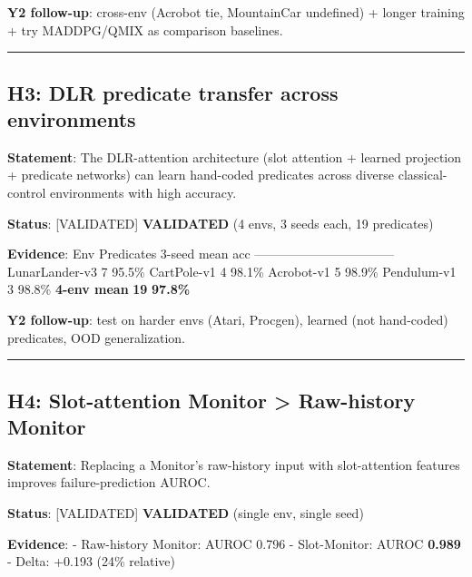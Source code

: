 \documentclass[
]{article}
\begin{document}
\textbf{Y2 follow-up}: cross-env (Acrobot tie, MountainCar undefined) +
longer training + try MADDPG/QMIX as comparison baselines.

\begin{center}\rule{0.5\linewidth}{0.5pt}\end{center}

\subsection{H3: DLR predicate transfer across
environments}\label{h3-dlr-predicate-transfer-across-environments}

\textbf{Statement}: The DLR-attention architecture (slot attention +
learned projection + predicate networks) can learn hand-coded predicates
across diverse classical-control environments with high accuracy.

\textbf{Status}: {[}VALIDATED{]} \textbf{VALIDATED} (4 envs, 3 seeds
each, 19 predicates)

\textbf{Evidence}: \textbar{} Env \textbar{} Predicates \textbar{}
3-seed mean acc \textbar{}
\textbar-----\textbar-----------\textbar------------------\textbar{}
\textbar{} LunarLander-v3 \textbar{} 7 \textbar{} 95.5\% \textbar{}
\textbar{} CartPole-v1 \textbar{} 4 \textbar{} 98.1\% \textbar{}
\textbar{} Acrobot-v1 \textbar{} 5 \textbar{} 98.9\% \textbar{}
\textbar{} Pendulum-v1 \textbar{} 3 \textbar{} 98.8\% \textbar{}
\textbar{} \textbf{4-env mean} \textbar{} \textbf{19} \textbar{}
\textbf{97.8\%} \textbar{}

\textbf{Y2 follow-up}: test on harder envs (Atari, Procgen), learned
(not hand-coded) predicates, OOD generalization.

\begin{center}\rule{0.5\linewidth}{0.5pt}\end{center}

\subsection{H4: Slot-attention Monitor \textgreater{} Raw-history
Monitor}\label{h4-slot-attention-monitor-raw-history-monitor}

\textbf{Statement}: Replacing a Monitor's raw-history input with
slot-attention features improves failure-prediction AUROC.

\textbf{Status}: {[}VALIDATED{]} \textbf{VALIDATED} (single env, single
seed)

\textbf{Evidence}: - Raw-history Monitor: AUROC 0.796 - Slot-Monitor:
AUROC \textbf{0.989} - Delta: +0.193 (24\% relative)
\end{document}

